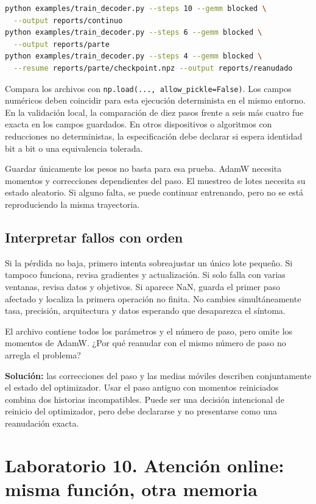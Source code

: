 \documentclass[12pt,a4paper,oneside]{report}
\begin{document}
\begin{lstlisting}[language=bash]
python examples/train_decoder.py --steps 10 --gemm blocked \
  --output reports/continuo
python examples/train_decoder.py --steps 6 --gemm blocked \
  --output reports/parte
python examples/train_decoder.py --steps 4 --gemm blocked \
  --resume reports/parte/checkpoint.npz --output reports/reanudado
\end{lstlisting}
Compara los archivos con \texttt{np.load(...,\allowbreak{} allow\_pickl\allowbreak{}e=False)}. Los campos numéricos deben coincidir para esta ejecución determinista en el mismo entorno. En la validación local, la comparación de diez pasos frente a seis más cuatro fue exacta en los campos guardados. En otros dispositivos o algoritmos con reducciones no deterministas, la especificación debe declarar si espera identidad bit a bit o una equivalencia tolerada.

Guardar únicamente los pesos no basta para esa prueba. AdamW necesita momentos y correcciones dependientes del paso. El muestreo de lotes necesita su estado aleatorio. Si alguno falta, se puede continuar entrenando, pero no se está reproduciendo la misma trayectoria.

\section{Interpretar fallos con orden}
Si la pérdida no baja, primero intenta sobreajustar un único lote pequeño. Si tampoco funciona, revisa gradientes y actualización. Si solo falla con varias ventanas, revisa datos y objetivos. Si aparece NaN, guarda el primer paso afectado y localiza la primera operación no finita. No cambies simultáneamente tasa, precisión, arquitectura y datos esperando que desaparezca el síntoma.

\begin{practica}[Un checkpoint que parece completo]
El archivo contiene todos los parámetros y el número de paso, pero omite los momentos de AdamW. ¿Por qué reanudar con el mismo número de paso no arregla el problema?

\textbf{Solución:} las correcciones del paso y las medias móviles describen conjuntamente el estado del optimizador. Usar el paso antiguo con momentos reiniciados combina dos historias incompatibles. Puede ser una decisión intencional de reinicio del optimizador, pero debe declararse y no presentarse como una reanudación exacta.

\end{practica}
\chapter{Laboratorio 10. Atención online: misma función, otra memoria}
\label{lab:diez}
\end{document}
